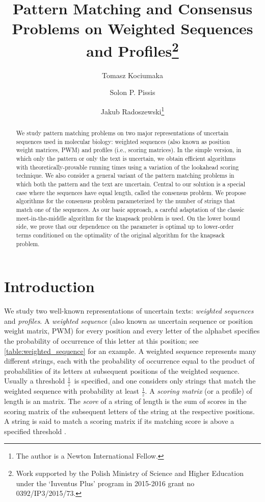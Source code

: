 \documentclass{article}
\title{Pattern Matching and Consensus Problems on Weighted Sequences and Profiles\footnote{Work supported by the Polish Ministry of Science and Higher Education under the `Iuventus Plus' program in 2015-2016 grant no 0392/IP3/2015/73.}}
\author[1]{Tomasz Kociumaka}
\author[2]{Solon P. Pissis}
\author[1,2]{Jakub Radoszewski\footnote{The author is a Newton International Fellow.}}
\affil[1]{Institute of Informatics, University of Warsaw, Warsaw, Poland\\
    \texttt{[kociumaka,jrad]@mimuw.edu.pl}}
\affil[2]{Department of Informatics, King's College London, London, UK\\
    \texttt{solon.pissis@kcl.ac.uk}
}
\date{\vspace{-5ex}}
\theoremstyle{plain}
\theoremstyle{definition}
\newcommand{\fr}{\ensuremath{\frac1z}}
\begin{document}
  \maketitle
\begin{abstract}
  We study pattern matching problems on two major representations of uncertain sequences used in molecular biology:
  weighted sequences (also known as position weight matrices, PWM) and profiles (i.e., scoring matrices).
  In the simple version, in which only the pattern or only the text is uncertain, 
  we obtain efficient algorithms with theoretically-provable running times using a variation of the lookahead scoring technique.
  We also consider a general variant of the pattern matching problems in which both the pattern and the text are uncertain.
  Central to our solution is a special case where the sequences have equal length, called the consensus problem.
  We propose algorithms for the consensus problem parameterized by the number of strings that match one of the sequences.
  As our basic approach, a careful adaptation of the classic meet-in-the-middle algorithm for the knapsack problem is used.
  On the lower bound side, we prove that our dependence on the parameter is optimal up to lower-order terms
  conditioned on the optimality of the original algorithm for the knapsack problem.
\end{abstract}

  \section{Introduction}
  We study two well-known representations of uncertain texts: \emph{weighted sequences} and \emph{profiles}.
  A \emph{weighted sequence} (also known as uncertain sequence or position weight matrix, PWM)
  for every position and every letter of the alphabet specifies the probability of occurrence of this letter at this position;
  see \cref{table:weighted_sequence} for an example.
  A weighted sequence represents many different strings, each with the probability
  of occurrence equal to the product of probabilities of its letters at subsequent positions of the weighted sequence.
  Usually a threshold \fr\ is specified, and one considers only strings that match the weighted sequence with probability at least \fr.
  A \emph{scoring matrix} (or a profile) of length  is an  matrix.
  The \emph{score} of a string of length  is the sum of scores in the scoring matrix of the subsequent
  letters of the string at the respective positions.
  A string is said to match a scoring matrix if its matching score is above a specified threshold .
\end{document}
